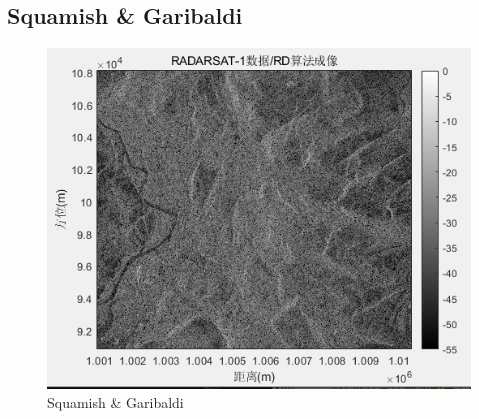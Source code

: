 \documentclass{article}
\begin{document}
\subsection{Squamish \& Garibaldi}
\begin{figure}[H] %
	\centering
	\includegraphics[scale=0.6]{13.png}
	\caption{Squamish \& Garibaldi}
	\label{13}
\end{figure}
\end{document}
